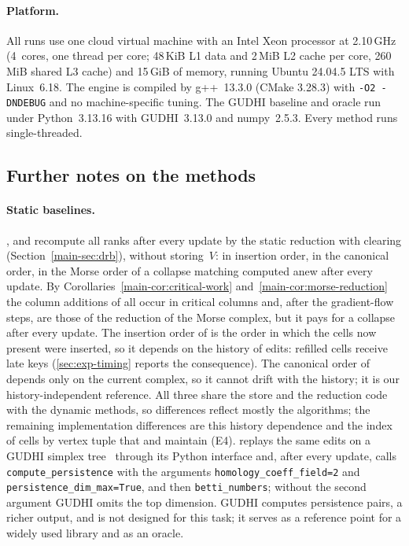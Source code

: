 \paragraph{Platform.}
All runs use one cloud virtual machine with an Intel Xeon processor at
2.10\,GHz (4~cores, one thread per core; 48\,KiB L1 data and 2\,MiB L2 cache per
core, 260\,MiB shared L3 cache) and 15\,GiB of memory, running Ubuntu 24.04.5
LTS with Linux~6.18. The engine is compiled by g++~13.3.0 (CMake 3.28.3) with
\texttt{-O2 -DNDEBUG} and no machine-specific tuning. The GUDHI baseline and
oracle run under Python~3.13.16 with GUDHI~3.13.0 and numpy~2.5.3. Every method
runs single-threaded.

\subsection{Further notes on the methods}\label{sec:exp-methods}

\paragraph{Static baselines.}
,  and  recompute all
ranks after every update by the static reduction with clearing
(Section~\ref{main-sec:drb}), without storing~$V$:  in insertion order,
 in the canonical order,  in the Morse
order of a collapse matching computed anew after every update. By
Corollaries~\ref{main-cor:critical-work} and~\ref{main-cor:morse-reduction} the column additions of
 all occur in critical columns and, after the gradient-flow
steps, are those of the reduction of the Morse complex, but it pays for a
collapse after every update. The insertion order of
 is the order in which the cells now present were inserted, so
it depends on the history of edits: refilled cells receive late keys
(\cref{sec:exp-timing} reports the consequence). The canonical order of
 depends only on the current complex, so it cannot drift
with the history; it is our history-independent reference. All three share the
store and the reduction code with the dynamic methods, so differences reflect
mostly the algorithms; the remaining implementation differences are this
history dependence and the index of cells by vertex tuple that
 and  maintain (E4).
 replays the same edits on a GUDHI simplex
tree~\cite{maria2014gudhi} through its Python interface and, after every update,
calls \texttt{compute\_persistence} with the arguments
\texttt{homology\_coeff\_field=2} and \texttt{persistence\_dim\_max=True}, and then
\texttt{betti\_numbers}; without the second argument GUDHI omits the top
dimension. GUDHI computes persistence pairs, a richer output, and is not designed
for this task; it serves as a reference point for a widely used library and as
an oracle.

